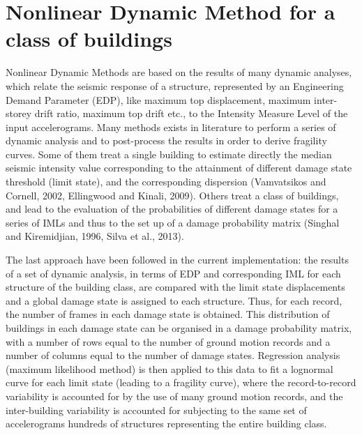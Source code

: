 \section{Nonlinear Dynamic Method for a class of buildings}
Nonlinear Dynamic Methods are based on the results of many dynamic analyses, which relate the seismic response of a structure, represented by an Engineering Demand Parameter (EDP), like maximum top displacement, maximum inter-storey drift ratio, maximum top drift etc., to the Intensity Measure Level of the input accelerograms. 
Many methods exists in literature to perform a series of dynamic analysis and to post-process the results in order to derive fragility curves. Some of them treat a single building to estimate directly the median seismic intensity value corresponding to the attainment of different damage state threshold (limit state), and the corresponding dispersion (Vamvatsikos and Cornell, 2002, Ellingwood and Kinali, 2009). Others treat a class of buildings, and lead to the evaluation of the probabilities of different damage states for a series of IMLs and thus to the set up of a damage probability matrix (Singhal and Kiremidjian, 1996, Silva et al., 2013).

The last approach have been followed in the current implementation: the results of a set of dynamic analysis, in terms of EDP and corresponding IML for each structure of the building class, are compared with the limit state displacements and a global damage state is assigned to each structure. Thus, for each record, the number of frames in each damage state is obtained. This distribution of buildings in each damage state can be organised in a damage probability matrix, with a number of rows equal to the number of ground motion records and a number of columns equal to the number of damage states. Regression analysis (maximum likelihood method) is then applied to this data to fit a lognormal curve for each limit state (leading to a fragility curve), where the record-to-record variability is accounted for by the use of many ground motion records, and the inter-building variability is accounted for subjecting to the same set of accelerograms hundreds of structures representing the entire building class.

